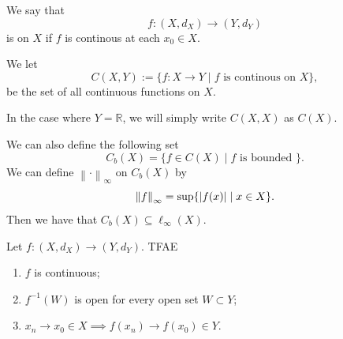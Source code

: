 \documentclass[notoc,notitlepage]{tufte-book}
\newcommand{\norm}[1]{\left\| #1 \right\|}
\begin{document}
\begin{defn}\label{defn:continuity_on_a_space}
  We say that
  \begin{equation*}
    f : (X, d_X) \to (Y, d_Y)
  \end{equation*}
  is  on $X$ if $f$ is continous at each $x_0 \in X$.
  
  We let
  \begin{equation*}
    C(X, Y) := \{ f : X \to Y \mid f \text{ is continous on } X \},
  \end{equation*}
  be the set of all continuous functions on $X$.
\end{defn}

\begin{note}
  In the case where $Y = \mathbb{R}$, we will simply write $C(X, X)$ as $C(X)$.
\end{note}

\begin{remark}
  We can also define the following set
  \begin{equation*}
    C_b(X) = \{ f \in C(X) \mid f \text{ is bounded } \}.
  \end{equation*}
  We can define $\norm\cdot_\infty$ on $C_b(X)$ by
  \begin{equation*}
    \norm{f}_\infty = \sup \{ \abs{ f(x) } \mid x \in X \}.
  \end{equation*}
  Then we have that $C_b(X) \subseteq \ell_\infty(X)$.
\end{remark}

\begin{thm}\label{thm:analogue_of_sequential_characterization_of_continuity_on_a_space_and_continuity_and_neighbourhoods}
  Let $f: (X, d_X) \to (Y, d_Y)$. TFAE
  \begin{enumerate}
    \item $f$ is continuous;
    \item $f^{-1}(W)$ is open for every open set $W \subset Y$;
    \item $x_n \to x_0 \in X \implies f(x_n) \to f(x_0) \in Y$.
  \end{enumerate}
\end{thm}
\end{document}
